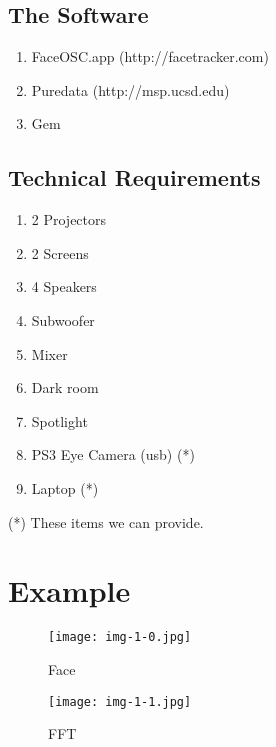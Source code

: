 \documentclass{article}
\begin{document}
\subsection{The Software}

\begin{enumerate}

\item FaceOSC.app (http://facetracker.com)


\item Puredata (http://msp.ucsd.edu)

\item Gem

\end{enumerate}

\subsection{Technical Requirements}

\begin{enumerate}
\item 2 Projectors
\item 2 Screens
\item 4 Speakers
\item Subwoofer
\item Mixer
\item Dark room
\item Spotlight
\item PS3 Eye Camera (usb) (*)
\item Laptop (*)

\end{enumerate}


\noindent (*) These items we can provide.


\iffalse

\section{Example}


\begin{figure}[htbp]
\begin{center}
\texttt{[image: img-1-0.jpg]}
\caption{Face}
\label{fig:face}
\end{center}
\end{figure}


\begin{figure}[htbp]
\begin{center}
\texttt{[image: img-1-1.jpg]}
\caption{FFT}
\label{fig:fft}
\end{center}
\end{figure}
\end{document}
